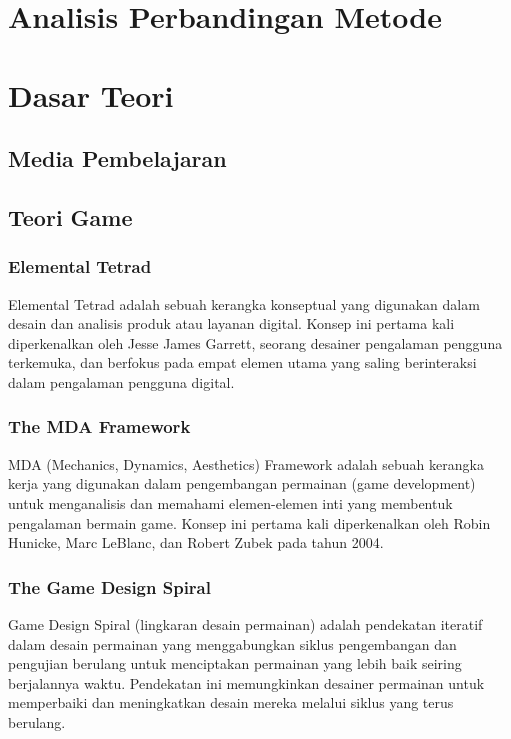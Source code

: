 \section{Analisis Perbandingan Metode}
\section{Dasar Teori}
\subsection{Media Pembelajaran}
\subsection{Teori Game}
\subsubsection{Elemental Tetrad} 
Elemental Tetrad adalah sebuah kerangka konseptual yang digunakan dalam desain dan analisis produk atau layanan digital. 
Konsep ini pertama kali diperkenalkan oleh Jesse James Garrett, seorang desainer pengalaman pengguna terkemuka, 
dan berfokus pada empat elemen utama yang saling berinteraksi dalam pengalaman pengguna digital.

\subsubsection{The MDA Framework}
MDA (Mechanics, Dynamics, Aesthetics) Framework adalah sebuah kerangka kerja yang digunakan dalam pengembangan permainan
(game development) untuk menganalisis dan memahami elemen-elemen inti yang membentuk pengalaman bermain game. 
Konsep ini pertama kali diperkenalkan oleh Robin Hunicke, Marc LeBlanc, dan Robert Zubek pada tahun 2004.
\subsubsection{The Game Design Spiral}
Game Design Spiral (lingkaran desain permainan) adalah pendekatan iteratif 
dalam desain permainan yang menggabungkan siklus pengembangan dan pengujian berulang untuk menciptakan 
permainan yang lebih baik seiring berjalannya waktu. Pendekatan ini memungkinkan desainer permainan untuk 
memperbaiki dan meningkatkan desain mereka melalui siklus yang terus berulang.
